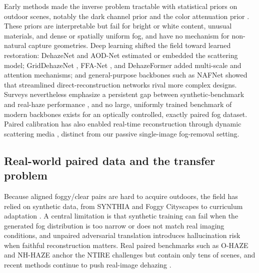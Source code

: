\documentclass{optica-article}
\begin{document}
Early methods made the inverse problem tractable with statistical
priors on outdoor scenes, notably the dark channel prior
\cite{he2010single} and the color attenuation prior
\cite{zhu2014single}. These priors are interpretable but fail for
bright or white content, unusual materials, and dense or
spatially uniform fog, and have no mechanism for non-natural
capture geometries. Deep learning shifted the field toward learned
restoration: DehazeNet \cite{cai2016dehazenet} and AOD-Net
\cite{li2017aod} estimated or embedded the scattering model;
GridDehazeNet \cite{liu2019griddehazenet}, FFA-Net
\cite{qin2020ffa}, and DehazeFormer \cite{song2023dehazeformer}
added multi-scale and attention mechanisms; and general-purpose
backbones such as NAFNet \cite{chen2022simple} showed that
streamlined direct-reconstruction networks rival more complex
designs. Surveys nevertheless emphasize a persistent gap between
synthetic-benchmark and real-haze performance
\cite{gui2021comprehensive}, and no large, uniformly trained
benchmark of modern backbones exists for an optically controlled,
exactly paired fog dataset. Paired calibration has also enabled
real-time reconstruction through dynamic scattering media
\cite{liu2024dynamic_scattering}, distinct from our passive
single-image fog-removal setting.
 
\subsection{Real-world paired data and the transfer problem}
 
Because aligned foggy/clear pairs are hard to acquire outdoors, the
field has relied on synthetic data, from SYNTHIA
\cite{ros2016synthia} and Foggy Cityscapes
\cite{sakaridis2018semantic} to curriculum adaptation
\cite{sakaridis2018model}. A central limitation is that synthetic training can fail when the generated fog distribution is too narrow or does not match real imaging conditions, and unpaired adversarial translation \cite{isola2017pix2pix,zhu2017unpaired} introduces hallucination
risk when faithful reconstruction matters. Real paired benchmarks
such as O-HAZE \cite{ancuti2018ohaze} and NH-HAZE
\cite{ancuti2020nhhaze} anchor the NTIRE challenges
\cite{ancuti2021ntire,histofusionnet2026} but contain only tens of
scenes, and recent methods continue to push real-image dehazing
\cite{chen2024pttd,chen2025dehazexl}.
 
\end{document}
